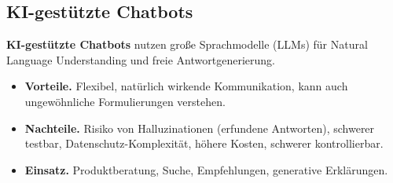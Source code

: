 \documentclass[11pt,a4paper,oneside]{article}
\newcommand{\fachbegriff}[1]{\textbf{#1}}
\begin{document}
\subsection{KI-gestützte Chatbots}

\fachbegriff{KI-gestützte Chatbots} nutzen große Sprachmodelle (LLMs) für Natural Language Understanding und freie Antwortgenerierung.

\begin{itemize}
  \item \textbf{Vorteile.} Flexibel, natürlich wirkende Kommunikation, kann auch ungewöhnliche Formulierungen verstehen.
  \item \textbf{Nachteile.} Risiko von Halluzinationen (erfundene Antworten), schwerer testbar, Datenschutz-Komplexität, höhere Kosten, schwerer kontrollierbar.
  \item \textbf{Einsatz.} Produktberatung, Suche, Empfehlungen, generative Erklärungen.
\end{itemize}
\end{document}

